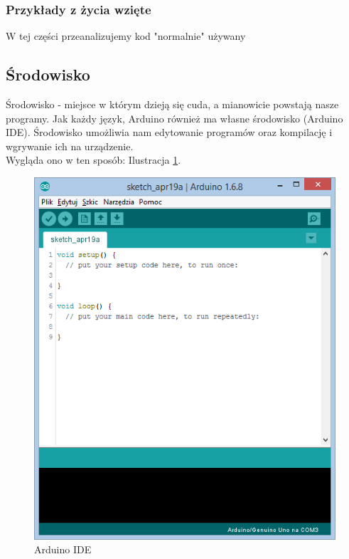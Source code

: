 \documentclass[a4paper,12pt, twoside]{article}
\begin{document}
\subsubsection{Przykłady z życia wzięte}
W tej części przeanalizujemy kod "normalnie" używany
	\subsection{Środowisko}
	\label{subsec:Srodowisko}
	Środowisko - miejsce w którym dzieją się cuda, a mianowicie powstają nasze programy. Jak każdy język, Arduino również ma własne środowisko (Arduino IDE).
	Środowisko umożliwia nam edytowanie programów oraz kompilację i wgrywanie ich na urządzenie.\\ %
		Wygląda ono w ten sposób: Ilustracja \ref{fig:IDE}.
	\begin{figure}[h]
			\centering
			\includegraphics[scale=0.7]{ArduinoIDE.png}
			\caption{Arduino IDE}
			\label{fig:IDE}
		\end{figure}
\end{document}

